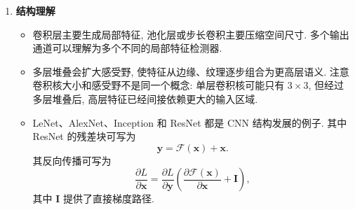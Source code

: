 \documentclass{../nndlcourse}
\begin{document}
\begin{enumerate}
\begin{itemize}
\[            =
            \left\lfloor
            \frac{W-V+2P_w}{S_w}
            \right\rfloor+1.
        \]
        公式中的分子表示卷积核能移动的有效范围, 除以步长表示移动次数, 最后的 $+1$ 是初始位置本身.
        \item 这里容易混淆三件事: 卷积核大小决定单层每个输出看到的局部窗口大小; 步长决定窗口每次移动多远; 填充决定边界外补多少圈. 填充可以保持空间尺寸, 步长通常会压缩空间尺寸.
        \item 池化也有类似的窗口移动公式. 对每个通道单独做池化, 若输入空间尺寸为 $H\times W$, 池化窗口大小为 $R_h\times R_w$, 填充为 $P_h^{\mathrm{pool}},P_w^{\mathrm{pool}}$, 步长为 $S_h^{\mathrm{pool}},S_w^{\mathrm{pool}}$, 则输出空间尺寸为
        \[
            H_{\mathrm{pool}}
            =
            \left\lfloor
            \frac{H-R_h+2P_h^{\mathrm{pool}}}{S_h^{\mathrm{pool}}}
            \right\rfloor+1,
            \qquad
            W_{\mathrm{pool}}
            =
            \left\lfloor
            \frac{W-R_w+2P_w^{\mathrm{pool}}}{S_w^{\mathrm{pool}}}
            \right\rfloor+1.
        \]
        以最大池化为例, 若输入第 $c$ 个通道为 $\boldsymbol{X}^{(c)}$, 则
        \[
            Y_{i,j,c}
            =
            \max_{0\le u<R_h,\;0\le v<R_w}
            X^{(c)}_{iS_h^{\mathrm{pool}}+u,\;jS_w^{\mathrm{pool}}+v}.
        \]
        平均池化只是把上式中的最大值换成窗口内平均值. 池化通常只改变空间尺寸, 不会自动改变通道数.
    \end{itemize}

    \item \textbf{结构理解}
    \begin{itemize}
        \item 卷积层主要生成局部特征, 池化层或步长卷积主要压缩空间尺寸. 多个输出通道可以理解为多个不同的局部特征检测器.
        \item 多层堆叠会扩大感受野, 使特征从边缘、纹理逐步组合为更高层语义. 注意卷积核大小和感受野不是同一个概念: 单层卷积核可能只有 $3\times3$, 但经过多层堆叠后, 高层特征已经间接依赖更大的输入区域.
        \item LeNet、AlexNet、Inception 和 ResNet 都是 CNN 结构发展的例子. 其中 ResNet 的残差块可写为
        \[
            \boldsymbol{y}
            =
            \mathcal{F}(\boldsymbol{x})
            +
            \boldsymbol{x}.
        \]
        其反向传播可写为
        \[
            \frac{\partial L}{\partial \boldsymbol{x}}
            =
            \frac{\partial L}{\partial \boldsymbol{y}}
            \left(
                \frac{\partial \mathcal{F}(\boldsymbol{x})}{\partial \boldsymbol{x}}
                +
                \boldsymbol{I}
            \right),
        \]
        其中 $\boldsymbol{I}$ 提供了直接梯度路径.
    \end{itemize}


\end{enumerate}
\end{document}
